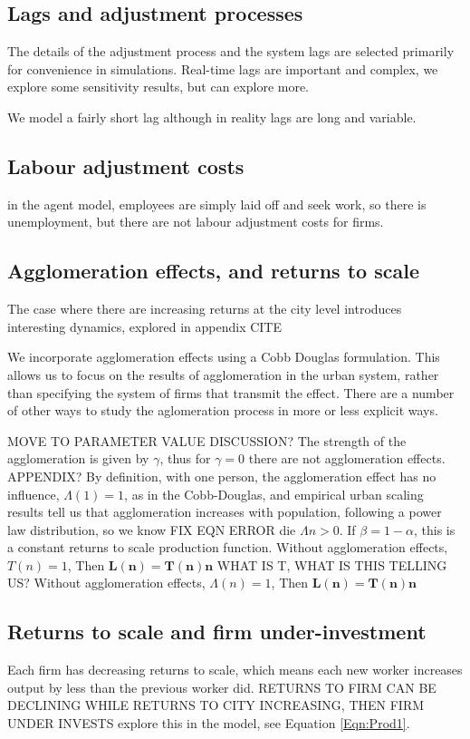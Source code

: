 \subsection{Lags and adjustment processes}
The details of the adjustment process and the system lags are selected primarily for convenience in simulations. Real-time lags are important and complex, we explore some sensitivity results, but can explore more. 

We model a fairly short lag although in reality lags are long and variable. 

\subsection{Labour adjustment costs}

in the agent model, employees are simply laid off and seek work, so there is unemployment, but there are not \glspl{labour adjustment cost} for firms.

\subsection{Agglomeration effects, and returns to scale}
The case where there are increasing returns at the city level introduces interesting dynamics, explored in appendix CITE %

We incorporate agglomeration effects using a Cobb Douglas formulation. This allows us to focus on the results of agglomeration in the urban system, rather than specifying the system of firms that transmit the effect. 
There are a number of other ways to study the aglomeration process in more or less explicit ways.

MOVE TO PARAMETER VALUE DISCUSSION?
The strength of the agglomeration is given by $\gamma$, thus for $\gamma=0$ there are not agglomeration effects. APPENDIX?
By definition, with one person, the agglomeration effect has no influence, $\Lambda(1)=1$,  as in the \gls{Cobb-Douglas}, and empirical urban scaling results tell us that agglomeration increases with population, following a power law distribution, so we know %
FIX EQN ERROR die ${\Lambda}{n}>0$. 
If $\beta=1-\alpha$, this is a \gls{constant returns to scale} production function. Without agglomeration effects, $T(n)=1$,  Then  \textbf{$\mathbf{L(n) = T(n) n}$}  WHAT IS T, WHAT IS THIS TELLING US?
Without agglomeration effects, $\Lambda(n)=1$,  Then  \textbf{$\mathbf{L(n) = T(n) n}$} 


\subsection{Returns to scale and firm under-investment}
Each firm has \gls{decreasing returns to scale}, which means each new worker increases output by less than the previous worker did.
RETURNS TO FIRM CAN BE DECLINING WHILE RETURNS TO CITY INCREASING, THEN FIRM UNDER INVESTS
explore this in the model, see Equation \ref{Eqn:Prod1}.

